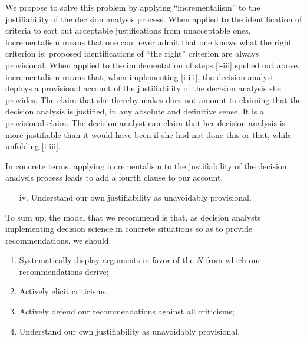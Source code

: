 \documentclass[preprint, french, english, 11pt, authoryear]{elsarticle}%
\begin{document}
We propose to solve this problem by applying ``incrementalism'' to the justifiability of the decision analysis process. When applied to the identification of criteria to sort out acceptable justifications from unacceptable ones, incrementalism means that one can never admit that one knows what the right criterion is: proposed identifications of ``the right'' criterion are always provisional. When applied to the implementation of steps [i-iii] spelled out above, incrementalism means that, when implementing [i-iii], the decision analyst deploys a provisional account of the justifiability of the decision analysis she provides. The claim that she thereby makes does not amount to claiming that the decision analysis is justified, in any absolute and definitive sense. It is a provisional claim. The decision analyst can claim that her decision analysis is more justifiable than it would have been if she had not done this or that, while unfolding [i-iii].

In concrete terms, applying incrementalism to the justifiability of the decision analysis process leads to add a fourth clause to our account.
\begin{itemize}
\item[iv.]	Understand our own justifiability as unavoidably provisional.
\end{itemize}

To sum up, the model that we recommend is that, as decision analysts implementing decision science in concrete situations so as to provide recommendations, we should:
\begin{enumerate}[label=\roman*.]
	\item Systematically display arguments in favor of the $N$ from which our recommendations derive;
	\item Actively elicit criticisms;
	\item Actively defend our recommendations against all criticisms;
	\item Understand our own justifiability as unavoidably provisional.
\end{enumerate}
\end{document}
